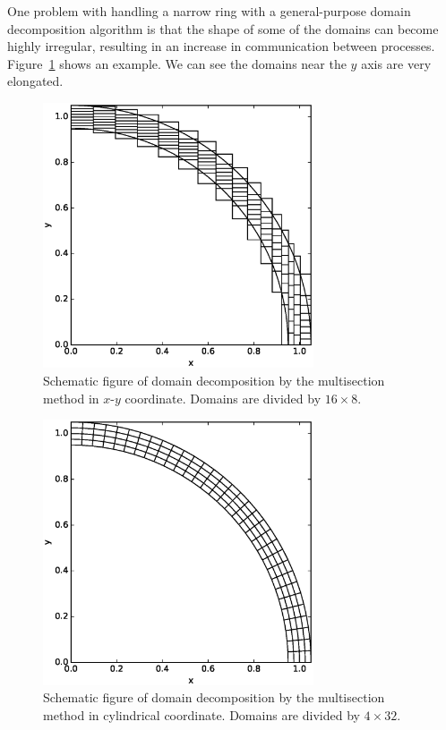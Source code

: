 \documentclass[oribibl]{llncs}
\begin{document}
One problem with handling a narrow ring with a general-purpose domain
decomposition algorithm is that the shape of some of the domains can
become highly irregular, resulting in an increase in communication
between processes. Figure~\ref{fig:domain_cart} shows an example. We
can see the domains near the $y$ axis are very elongated.

\begin{figure}
  \centering \includegraphics[width=8cm,clip]{./fig/domain_cart.eps}
  \caption{Schematic figure of domain decomposition by the multisection
    method in $x$-$y$ coordinate. Domains are divided by $16 \times 8$.}
  \label{fig:domain_cart}
\end{figure}

\begin{figure}
  \centering
    \includegraphics[width=8cm,clip]{./fig/domain_cyl.eps}
  \caption{Schematic figure of domain decomposition by the multisection
    method in cylindrical coordinate. Domains are divided by $4 \times 32$.}
  \label{fig:domain_cyl}
\end{figure}
\end{document}
